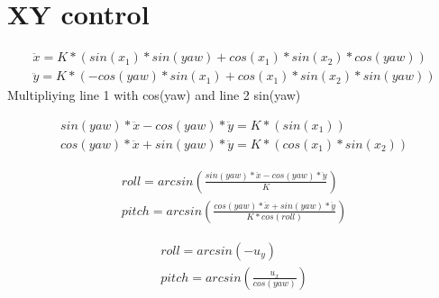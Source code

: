 \documentclass{article}
\begin{document}
\section{XY control}
\begin{gather*}
	\ddot{x} = K * ( sin(x_1) * sin(yaw)+ cos(x_1) * sin(x_2) * cos(yaw))\\
	\ddot{y} = K * ( -cos(yaw)* sin(x_1) + cos(x_1) * sin(x_2) * sin(yaw))
\end{gather*}
Multipliying line 1 with cos(yaw) and line 2 sin(yaw)

\begin{gather*}
	sin(yaw)* \ddot{x} - cos(yaw)* \ddot{y} = K * ( sin(x_1))\\
	cos(yaw)* \ddot{x} + sin(yaw)* \ddot{y} = K * ( cos(x_1) * sin(x_2) )
\end{gather*}

\begin{gather*}
	roll = arcsin \left (\frac{sin(yaw)*\ddot{x} - cos(yaw) * \ddot{y}}{K} \right )\\
	pitch = arcsin \left (\frac{cos(yaw)*\ddot{x} + sin(yaw) * \ddot{y}}{K * cos(roll)} \right)
\end{gather*}

\begin{gather*}
	roll = arcsin(-u_y)\\
	pitch = arcsin \left ( \frac{u_x}{cos(yaw)} \right )
\end{gather*}
\end{document}
